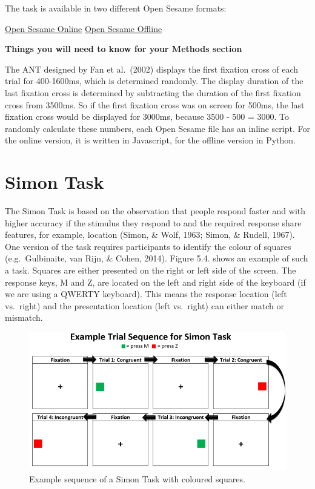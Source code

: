 \documentclass[
]{book}
\begin{document}
The task is available in two different Open Sesame formats:

\href{link\%20here}{Open Sesame Online} \textbar{} \href{link\%20here}{Open Sesame Offline}

\textbf{Things you will need to know for your Methods section}

The ANT designed by Fan et al.~(2002) displays the first fixation cross of each trial for 400-1600ms, which is determined randomly. The display duration of the last fixation cross is determined by subtracting the duration of the first fixation cross from 3500ms. So if the first fixation cross was on screen for 500ms, the last fixation cross would be displayed for 3000ms, because 3500 - 500 = 3000. To randomly calculate these numbers, each Open Sesame file has an inline script. For the online version, it is written in Javascript, for the offline version in Python.

\hypertarget{simon-task}{%
\section{Simon Task}\label{simon-task}}

The Simon Task is based on the observation that people respond faster and with higher accuracy if the stimulus they respond to and the required response share features, for example, location (Simon, \& Wolf, 1963; Simon, \& Rudell, 1967). One version of the task requires participants to identify the colour of squares (e.g.~Gulbinaite, van Rijn, \& Cohen, 2014). Figure 5.4. shows an example of such a task. Squares are either presented on the right or left side of the screen. The response keys, M and Z, are located on the left and right side of the keyboard (if we are using a QWERTY keyboard). This means the response location (left vs.~right) and the presentation location (left vs.~right) can either match or mismatch.

\begin{figure}

{\centering \includegraphics[width=0.8\linewidth]{images/SimonTaskExample} 

}

\caption{Example sequence of a Simon Task with coloured squares.}\label{fig:Figure2-4}
\end{figure}
\end{document}
